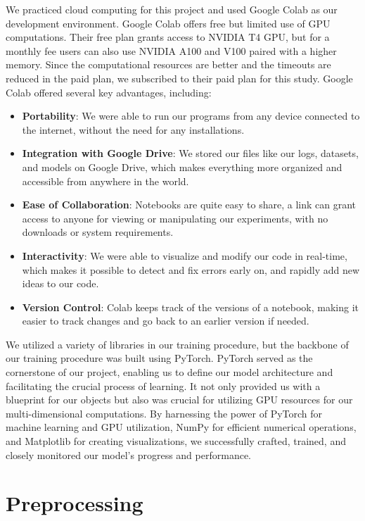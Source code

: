We practiced cloud computing for this project and used Google Colab as our development environment. Google Colab offers free but limited use of GPU computations. Their free plan grants access to NVIDIA T4 GPU, but for a monthly fee users can also use NVIDIA A100 and V100 paired with a higher memory. Since the computational resources are better and the timeouts are reduced in the paid plan, we subscribed to their paid plan for this study. Google Colab offered several key advantages, including:

\begin{itemize}
    \item \textbf{Portability}: We were able to run our programs from any device connected to the internet, without the need for any installations.
    \item \textbf{Integration with Google Drive}: We stored our files like our logs, datasets, and models on Google Drive, which makes everything more organized and accessible from anywhere in the world.
    \item \textbf{Ease of Collaboration}: Notebooks are quite easy to share, a link can grant access to anyone for viewing or manipulating our experiments, with no downloads or system requirements.
    \item \textbf{Interactivity}: We were able to visualize and modify our code in real-time, which makes it possible to detect and fix errors early on, and rapidly add new ideas to our code.
    \item \textbf{Version Control}: Colab keeps track of the versions of a notebook, making it easier to track changes and go back to an earlier version if needed.
\end{itemize}

We utilized a variety of libraries in our training procedure, but the backbone of our training procedure was built using PyTorch. PyTorch served as the cornerstone of our project, enabling us to define our model architecture and facilitating the crucial process of learning. It not only provided us with a blueprint for our objects but also was crucial for utilizing GPU resources for our multi-dimensional computations. By harnessing the power of PyTorch for machine learning and GPU utilization, NumPy for efficient numerical operations, and Matplotlib for creating visualizations, we successfully crafted, trained, and closely monitored our model's progress and performance.


\section{Preprocessing}
\label{sec:preprocessing}

